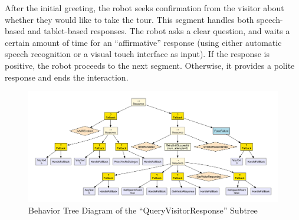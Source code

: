\documentclass{CSSRforAfrica}
\begin{document}
After the initial greeting, the robot seeks confirmation from the visitor about whether they would like to take the tour. This segment handles both speech-based and tablet-based responses. The robot asks a clear question, and waits a certain amount of time for an ``affirmative'' response (using either automatic speech recognition or a visual touch interface as input). If the response is positive, the robot proceeds to the next segment. Otherwise, it provides a polite response and ends the interaction.

\begin{landscape}

\hspace{-2cm}
\begin{figure}[H]
  \centering
  \includegraphics[width=1.08\linewidth]{./diagrams/query.pdf}
  \caption{Behavior Tree Diagram of the ``QueryVisitorResponse'' Subtree}
  \label{fig:query_diagram}
\end{figure}
\end{landscape}
\end{document}
